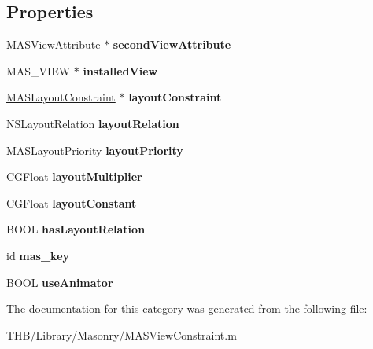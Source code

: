 \subsection*{Properties}
\begin{DoxyCompactItemize}
\item 
\mbox{\label{category_m_a_s_view_constraint_07_08_a71dae20a323cdf44867c4a9c68768780}} 
\mbox{\hyperlink{interface_m_a_s_view_attribute}{M\+A\+S\+View\+Attribute}} $\ast$ {\bfseries second\+View\+Attribute}
\item 
\mbox{\label{category_m_a_s_view_constraint_07_08_a22cdb5ef15202de9e9c55f7ccb825207}} 
M\+A\+S\+\_\+\+V\+I\+EW $\ast$ {\bfseries installed\+View}
\item 
\mbox{\label{category_m_a_s_view_constraint_07_08_aaec1a4799ba62fca58c0cf7fbd72f590}} 
\mbox{\hyperlink{interface_m_a_s_layout_constraint}{M\+A\+S\+Layout\+Constraint}} $\ast$ {\bfseries layout\+Constraint}
\item 
\mbox{\label{category_m_a_s_view_constraint_07_08_a20ec6e29eb542ebcdcee97d315e2f4e5}} 
N\+S\+Layout\+Relation {\bfseries layout\+Relation}
\item 
\mbox{\label{category_m_a_s_view_constraint_07_08_ac225ae123ee8924746ce59fd500f4fb6}} 
M\+A\+S\+Layout\+Priority {\bfseries layout\+Priority}
\item 
\mbox{\label{category_m_a_s_view_constraint_07_08_aa3be53ae4bdaf2bfe59c11411eac4540}} 
C\+G\+Float {\bfseries layout\+Multiplier}
\item 
\mbox{\label{category_m_a_s_view_constraint_07_08_a332b87978c71adca20fb142295c51189}} 
C\+G\+Float {\bfseries layout\+Constant}
\item 
\mbox{\label{category_m_a_s_view_constraint_07_08_af5184c7b3ac97003bdb1d87e9a09df56}} 
B\+O\+OL {\bfseries has\+Layout\+Relation}
\item 
\mbox{\label{category_m_a_s_view_constraint_07_08_ab6c4ce32aea02d93cf6eba1c17d42e87}} 
id {\bfseries mas\+\_\+key}
\item 
\mbox{\label{category_m_a_s_view_constraint_07_08_a8470b5393c7e7153c5e3f6f27b0b6187}} 
B\+O\+OL {\bfseries use\+Animator}
\end{DoxyCompactItemize}


The documentation for this category was generated from the following file\+:\begin{DoxyCompactItemize}
\item 
T\+H\+B/\+Library/\+Masonry/M\+A\+S\+View\+Constraint.\+m\end{DoxyCompactItemize}
